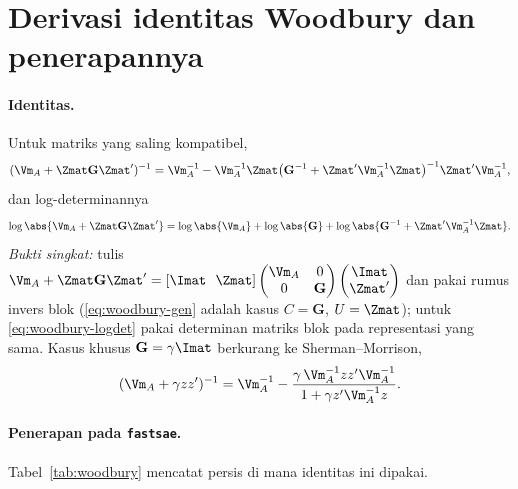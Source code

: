 \appendix

\section{Derivasi identitas Woodbury dan penerapannya}\label{app:woodbury}

\paragraph{Identitas.} Untuk matriks yang saling kompatibel,
\begin{equation}
  (\Vm_A+\Zmat\mathbf G\Zmat')^{-1}
  =\Vm_A^{-1}-\Vm_A^{-1}\Zmat
   \bigl(\mathbf G^{-1}+\Zmat'\Vm_A^{-1}\Zmat\bigr)^{-1}
   \Zmat'\Vm_A^{-1},
  \label{eq:woodbury-gen}
\end{equation}
dan log-determinannya
\begin{equation}
  \log\abs{\Vm_A+\Zmat\mathbf G\Zmat'}
  =\log\abs{\Vm_A}+\log\abs{\mathbf G}
   +\log\abs{\mathbf G^{-1}+\Zmat'\Vm_A^{-1}\Zmat}.
  \label{eq:woodbury-logdet}
\end{equation}
\emph{Bukti singkat:} tulis $\Vm_A+\Zmat\mathbf G\Zmat'=
[\Imat\ \ \Zmat]\begin{pmatrix}\Vm_A&0\\0&\mathbf G\end{pmatrix}
\begin{pmatrix}\Imat\\ \Zmat'\end{pmatrix}$ dan pakai rumus invers blok
(\eqref{eq:woodbury-gen} adalah kasus $C=\mathbf G$, $U=\Zmat$); untuk
\eqref{eq:woodbury-logdet} pakai determinan matriks blok pada representasi
yang sama. Kasus khusus $\mathbf G=\gamma\Imat$ berkurang ke
Sherman--Morrison,
\begin{equation}
  (\Vm_A+\gamma z z')^{-1}=\Vm_A^{-1}
  -\frac{\gamma\,\Vm_A^{-1}zz'\Vm_A^{-1}}{1+\gamma z'\Vm_A^{-1}z}.
  \label{eq:sm}
\end{equation}

\paragraph{Penerapan pada \texttt{fastsae}.} Tabel~\ref{tab:woodbury} mencatat
persis di mana identitas ini dipakai.

